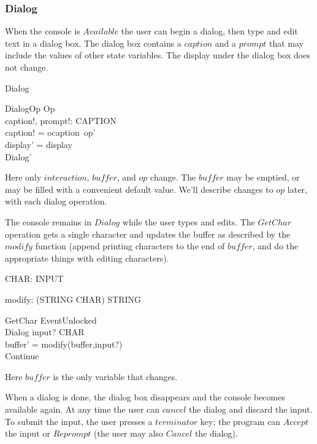 \documentclass{article}
\begin{document}
\subsubsection{Dialog}

When the console is $Available$ the user can begin a dialog, then type
and edit text in a dialog box.  The dialog box contains a $caption$
and a $prompt$ that may include the values of other state variables.
The display under the dialog box does not change.

\begin{zed} Dialog  \end{zed}

\begin{schema}{DialogOp}
	Op \\
	caption!, prompt!: CAPTION \\
\where
	caption! = ocaption~op' \\
	display' = display \\
	Dialog'
\end{schema}
Here only $interaction$, $buffer$, and $op$ change.  The $buffer$ may
be emptied, or may be filled with a convenient default value.  We'll describe
changes to $op$ later, with each dialog operation.

The console remains in $Dialog$ while the user types and edits.
The $GetChar$ operation gets a single character and
updates the buffer as described by the $modify$ function (append
printing characters to the end of $buffer$, and do the appropriate
things with editing characters).

\begin{axdef}
	CHAR: \power INPUT
\end{axdef}
\begin{axdef}
	modify: (STRING \cross CHAR) \fun STRING
\end{axdef}

\begin{schema}{GetChar}
	EventUnlocked \\
	\Delta Dialog
\where
	input? \in CHAR \\
	buffer' = modify(buffer,input?) \\
	Continue 
\end{schema}
Here $buffer$ is the only variable that changes.

When a dialog is done, the dialog box disappears and the console
becomes available again. At any time the user can $cancel$ the dialog
and discard the input.  To submit the input, the user presses a
$terminator$ key; the program can $Accept$ the input or $Reprompt$
(the user may also $Cancel$ the dialog).
\end{document}
